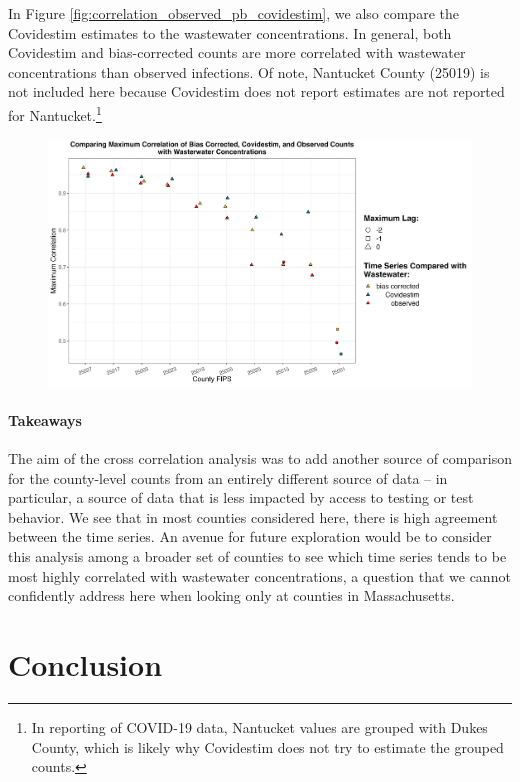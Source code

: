\documentclass[12pt,twoside]{smiththesis}
\begin{document}
In Figure \ref{fig:correlation_observed_pb_covidestim}, we also compare the Covidestim estimates to the wastewater concentrations. In general, both Covidestim and bias-corrected counts are more correlated with wastewater concentrations than observed infections. Of note, Nantucket County (25019) is not included here because Covidestim does not report estimates are not reported for Nantucket.\footnote{In reporting of COVID-19 data, Nantucket values are grouped with Dukes County, which is likely why Covidestim does not try to estimate the grouped counts.}
\begin{figure}
\includegraphics[width=1\linewidth]{figure/correlation_observed_pb_covidestim} \caption{\label{fig:correlation_observed_pb_covidestim}}\label{fig:unnamed-chunk-86}
\end{figure}
\hypertarget{takeaways}{%
\subsubsection{Takeaways}\label{takeaways}}

The aim of the cross correlation analysis was to add another source of comparison for the county-level counts from an entirely different source of data -- in particular, a source of data that is less impacted by access to testing or test behavior. We see that in most counties considered here, there is high agreement between the time series. An avenue for future exploration would be to consider this analysis among a broader set of counties to see which time series tends to be most highly correlated with wastewater concentrations, a question that we cannot confidently address here when looking only at counties in Massachusetts.

\hypertarget{conclusion}{%
\chapter{Conclusion}\label{conclusion}}
\end{document}
